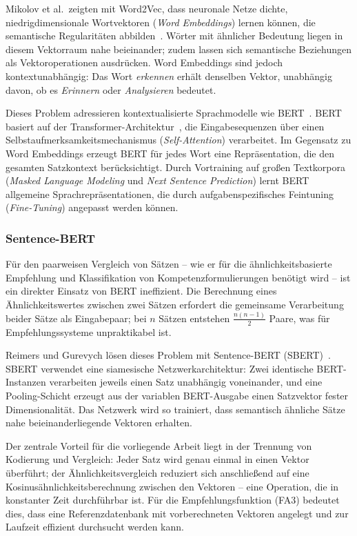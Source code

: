 Mikolov et al.\ zeigten mit Word2Vec, dass neuronale Netze dichte, niedrigdimensionale Wortvektoren (\emph{Word Embeddings}) lernen können, die semantische Regularitäten abbilden~\cite{mikolov2013word2vec}.
Wörter mit ähnlicher Bedeutung liegen in diesem Vektorraum nahe beieinander; zudem lassen sich semantische Beziehungen als Vektoroperationen ausdrücken.
Word Embeddings sind jedoch kontextunabhängig: Das Wort \emph{erkennen} erhält denselben Vektor, unabhängig davon, ob es \emph{Erinnern} oder \emph{Analysieren} bedeutet.

Dieses Problem adressieren kontextualisierte Sprachmodelle wie BERT~\cite{devlin2019bert}.
BERT basiert auf der Transformer-Architektur~\cite{vaswani2017attention}, die Eingabesequenzen über einen Selbstaufmerksamkeitsmechanismus (\emph{Self-Attention}) verarbeitet.
Im Gegensatz zu Word Embeddings erzeugt BERT für jedes Wort eine Repräsentation, die den gesamten Satzkontext berücksichtigt.
Durch Vortraining auf großen Textkorpora (\emph{Masked Language Modeling} und \emph{Next Sentence Prediction}) lernt BERT allgemeine Sprachrepräsentationen, die durch aufgabenspezifisches Feintuning (\emph{Fine-Tuning}) angepasst werden können.

\subsubsection{Sentence-BERT}

Für den paarweisen Vergleich von Sätzen -- wie er für die ähnlichkeitsbasierte Empfehlung und Klassifikation von Kompetenzformulierungen benötigt wird -- ist ein direkter Einsatz von BERT ineffizient.
Die Berechnung eines Ähnlichkeitswertes zwischen zwei Sätzen erfordert die gemeinsame Verarbeitung beider Sätze als Eingabepaar; bei $n$ Sätzen entstehen $\frac{n(n-1)}{2}$ Paare, was für Empfehlungssysteme unpraktikabel ist.

Reimers und Gurevych lösen dieses Problem mit Sentence-BERT (SBERT)~\cite{reimers2019sentencebert}.
SBERT verwendet eine siamesische Netzwerkarchitektur: Zwei identische BERT-Instanzen verarbeiten jeweils einen Satz unabhängig voneinander, und eine Pooling-Schicht erzeugt aus der variablen BERT-Ausgabe einen Satzvektor fester Dimensionalität.
Das Netzwerk wird so trainiert, dass semantisch ähnliche Sätze nahe beieinanderliegende Vektoren erhalten.

Der zentrale Vorteil für die vorliegende Arbeit liegt in der Trennung von Kodierung und Vergleich:
Jeder Satz wird genau einmal in einen Vektor überführt; der Ähnlichkeitsvergleich reduziert sich anschließend auf eine Kosinusähnlichkeitsberechnung zwischen den Vektoren -- eine Operation, die in konstanter Zeit durchführbar ist.
Für die Empfehlungsfunktion (FA3) bedeutet dies, dass eine Referenzdatenbank mit vorberechneten Vektoren angelegt und zur Laufzeit effizient durchsucht werden kann.


